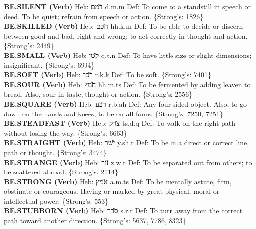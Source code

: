 {\textbf{BE.SILENT (Verb)} Heb: {\large\H דמם} d.m.m Def: To come to a standstill in speech or deed. To be quiet; refrain from speech or action. \{Strong's: 1826\}\hfill{}\\

\textbf{BE.SKILLED (Verb)} Heb: {\large\H חכם} hh.k.m Def: To be able to decide or discern between good and bad, right and wrong; to act correctly in thought and action. \{Strong's: 2449\}\hfill{}\\

\textbf{BE.SMALL (Verb)} Heb: {\large\H קטן} q.t.n Def: To have little size or slight dimensions; insignificant. \{Strong's: 6994\}\hfill{}\\

\textbf{BE.SOFT (Verb)} Heb: {\large\H רכך} r.k.k Def: To be soft. \{Strong's: 7401\}\hfill{}\\

\textbf{BE.SOUR (Verb)} Heb: {\large\H חמץ} hh.m.ts Def: To be fermented by adding leaven to bread. Also, sour in taste, thought or action. \{Strong's: 2556\}\hfill{}\\

\textbf{BE.SQUARE (Verb)} Heb: {\large\H רבע} r.b.ah Def: Any four sided object. Also, to go down on the hands and knees, to be on all fours. \{Strong's: 7250, 7251\}\hfill{}\\

\textbf{BE.STEADFAST (Verb)} Heb: {\large\H צדק} ts.d.q Def: To walk on the right path without losing the way. \{Strong's: 6663\}\hfill{}\\

\textbf{BE.STRAIGHT (Verb)} Heb: {\large\H ישר} y.sh.r Def: To be in a direct or correct line, path or thought. \{Strong's: 3474\}\hfill{}\\

\textbf{BE.STRANGE (Verb)} Heb: {\large\H זור} z.w.r Def: To be separated out from others; to be scattered abroad. \{Strong's: 2114\}\hfill{}\\

\textbf{BE.STRONG (Verb)} Heb: {\large\H אמץ} a.m.ts Def: To be mentally astute, firm, obstinate or courageous. Having or marked by great physical, moral or intellectual power. \{Strong's: 553\}\hfill{}\\

\textbf{BE.STUBBORN (Verb)} Heb: {\large\H סרר} s.r.r Def: To turn away from the correct path toward another direction. \{Strong's: 5637, 7786, 8323\}\hfill{}\\

}
